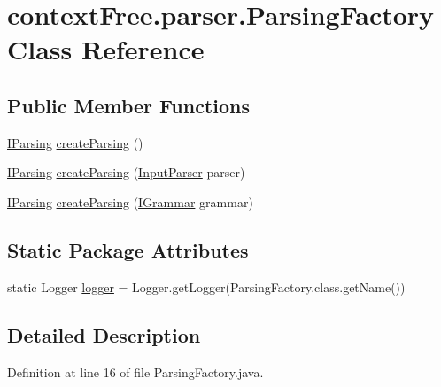 \hypertarget{classcontext_free_1_1parser_1_1_parsing_factory}{\section{context\-Free.\-parser.\-Parsing\-Factory Class Reference}
\label{classcontext_free_1_1parser_1_1_parsing_factory}
}
\subsection*{Public Member Functions}
\begin{DoxyCompactItemize}
\item 
\hyperlink{interfacecontext_free_1_1parser_1_1_i_parsing}{I\-Parsing} \hyperlink{classcontext_free_1_1parser_1_1_parsing_factory_a00fcf785d868bedecdc468d73fadc452}{create\-Parsing} ()
\item 
\hyperlink{interfacecontext_free_1_1parser_1_1_i_parsing}{I\-Parsing} \hyperlink{classcontext_free_1_1parser_1_1_parsing_factory_acf534fd4dab972ffd7a09eec5e50dae7}{create\-Parsing} (\hyperlink{classinput_parser_1_1_input_parser}{Input\-Parser} parser)
\item 
\hyperlink{interfacecontext_free_1_1parser_1_1_i_parsing}{I\-Parsing} \hyperlink{classcontext_free_1_1parser_1_1_parsing_factory_a579ba195277d473570e1576377f585d5}{create\-Parsing} (\hyperlink{interfacecontext_free_1_1grammar_1_1_i_grammar}{I\-Grammar} grammar)
\end{DoxyCompactItemize}
\subsection*{Static Package Attributes}
\begin{DoxyCompactItemize}
\item 
static Logger \hyperlink{classcontext_free_1_1parser_1_1_parsing_factory_ac398af48e8f8b3d4cce4c8f7c532b09b}{logger} = Logger.\-get\-Logger(Parsing\-Factory.\-class.\-get\-Name())
\end{DoxyCompactItemize}


\subsection{Detailed Description}


Definition at line 16 of file Parsing\-Factory.\-java.



